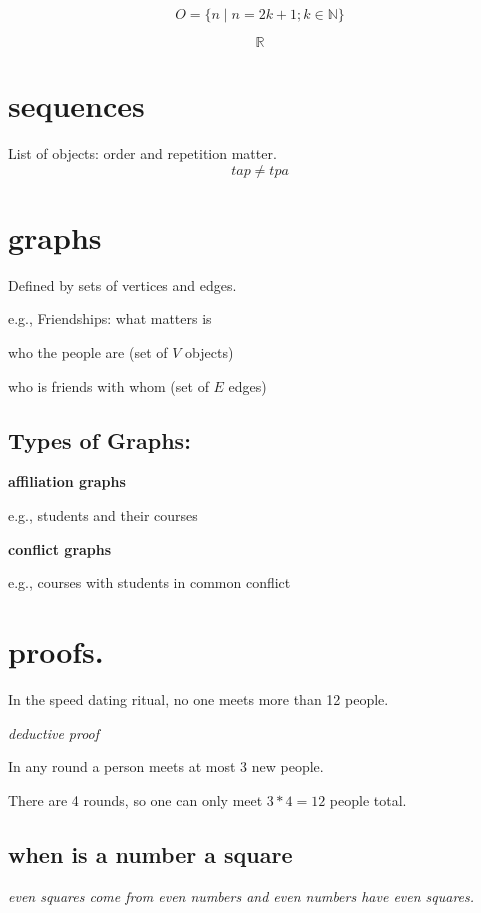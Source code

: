 \documentclass[11pt]{article}
\begin{document}
$$ O = \{ n  \mid  n = 2k + 1; k \in \mathbb{N} \} $$

\smallskip 

$$ \mathbb{R} $$

\section{sequences}

List of objects: order and repetition matter.
$$tap \neq tpa$$


\section{graphs}

Defined by sets of vertices and edges.

\smallskip

\noindent e.g., Friendships: what matters is
	
	who the people are (set of $V$ objects)
	
	who is friends with whom (set of $E$ edges)
	

\subsection{Types of Graphs:}
\textbf{affiliation graphs}

e.g., students and their courses

\noindent \textbf{conflict graphs}

e.g., courses with students in common conflict
	
	
\section{proofs.}
In the speed dating ritual, no one meets more than 12 people.

\textit{deductive proof}

In any round a person meets at most 3 new people.

There are 4 rounds, so one can only meet $3 * 4 = 12$ people total.

\smallskip

\subsection{when is a number a square}

\textit{even squares come from even numbers and even numbers have even squares.}
\end{document}
